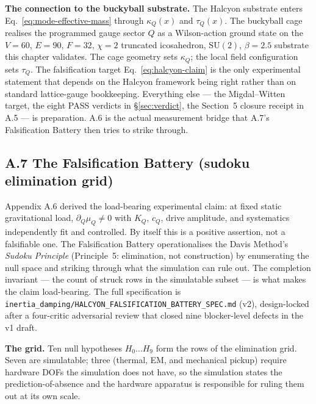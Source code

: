\documentclass[12pt,a4paper]{article}
\theoremstyle{plain}
\theoremstyle{definition}
\theoremstyle{remark}
\begin{document}
\textbf{The connection to the buckyball substrate.} The Halcyon substrate enters Eq.~\ref{eq:mode-effective-mass} through $\kappa_{Q}(x)$ and $\tau_{Q}(x)$. The buckyball cage realises the programmed gauge sector $Q$ as a Wilson-action ground state on the $V=60$, $E=90$, $F=32$, $\chi=2$ truncated icosahedron, $\mathrm{SU}(2)$, $\beta=2.5$ substrate this chapter validates. The cage geometry sets $\kappa_{Q}$; the local field configuration sets $\tau_{Q}$. The falsification target Eq.~\ref{eq:halcyon-claim} is the only experimental statement that depends on the Halcyon framework being right rather than on standard lattice-gauge bookkeeping. Everything else --- the Migdal--Witten target, the eight PASS verdicts in \S\ref{sec:verdict}, the Section~5 closure receipt in A.5 --- is preparation. A.6 is the actual measurement bridge that A.7's Falsification Battery then tries to strike through.

\subsection*{A.7 The Falsification Battery (sudoku elimination grid)}
\label{subsec:battery}

Appendix A.6 derived the load-bearing experimental claim: at fixed static gravitational load, $\partial_Q \mu_Q \ne 0$ with $K_Q$, $c_Q$, drive amplitude, and systematics independently fit and controlled. By itself this is a positive assertion, not a falsifiable one. The Falsification Battery operationalises the Davis Method's \emph{Sudoku Principle} (Principle~5: elimination, not construction) by enumerating the null space and striking through what the simulation can rule out. The completion invariant --- the count of struck rows in the simulatable subset --- is what makes the claim load-bearing. The full specification is \texttt{inertia\_damping/HALCYON\_FALSIFICATION\_BATTERY\_SPEC.md} (v2), design-locked after a four-critic adversarial review that closed nine blocker-level defects in the v1 draft.

\textbf{The grid.} Ten null hypotheses $H_0\ldots H_9$ form the rows of the elimination grid. Seven are simulatable; three (thermal, EM, and mechanical pickup) require hardware DOFs the simulation does not have, so the simulation states the prediction-of-absence and the hardware apparatus is responsible for ruling them out at its own scale.
\end{document}
